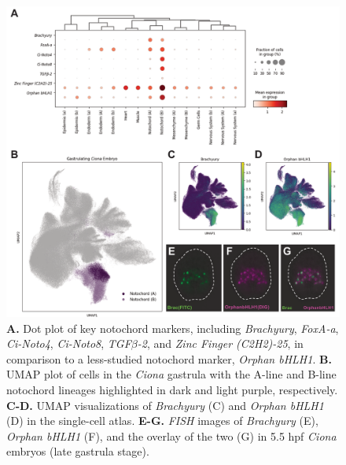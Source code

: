 \begin{figure}[p]
    \centering
    \includegraphics[scale=.8]{4_figures-and-files/Fig2_Notochord-Markers.png}
    \caption[Canonical \textit{Ciona} notochord markers \textit{Brachyury} and \textit{Orphan bHLH1} assist in validating cell clusters]{\textbf{A.} Dot plot of key notochord markers, including \textit{Brachyury}, \textit{FoxA-a}, \textit{Ci-Noto4}, \textit{Ci-Noto8}, \textit{TGF$\beta$-2}, and \textit{Zinc Finger (C2H2)-25}, in comparison to a less-studied notochord marker, \textit{Orphan bHLH1}. \textbf{B.} UMAP plot of cells in the \textit{Ciona} gastrula with the A-line and B-line notochord lineages highlighted in dark and light purple, respectively. \textbf{C-D.} UMAP visualizations of \textit{Brachyury} (C) and \textit{Orphan bHLH1} (D) in the single-cell atlas. \textbf{E-G.} \textit{FISH} images of \textit{Brachyury} (E), \textit{Orphan bHLH1} (F), and the overlay of the two (G) in 5.5 hpf \textit{Ciona} embryos (late gastrula stage).}
    \label{fig:2 single cell notochord markers}
\end{figure}

